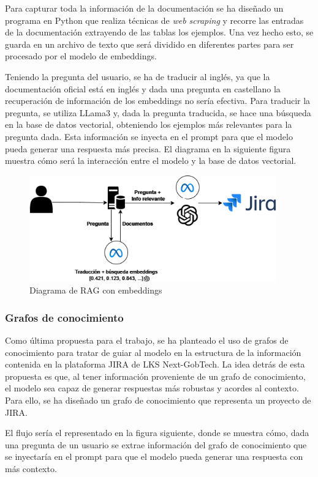 Para capturar toda la información de la documentación se ha diseñado un programa en Python que realiza técnicas de \textit{web scraping} y recorre las entradas de la documentación extrayendo de las tablas los ejemplos. Una vez hecho esto, se guarda en un archivo de texto que será dividido en diferentes partes para ser procesado por el modelo de embeddings.

Teniendo la pregunta del usuario, se ha de traducir al inglés, ya que la documentación oficial está en inglés y dada una pregunta en castellano la recuperación de información de los embeddings no sería efectiva. Para traducir la pregunta, se utiliza LLama3 y, dada la pregunta traducida, se hace una búsqueda en la base de datos vectorial, obteniendo los ejemplos más relevantes para la pregunta dada. Esta información se inyecta en el prompt para que el modelo pueda generar una respuesta más precisa. El diagrama en la siguiente figura muestra cómo será la interacción entre el modelo y la base de datos vectorial.

\begin{figure}[H]
    \centering
    \includegraphics[width=0.95\textwidth]{images/rag_embeddings.png}
    \caption{Diagrama de RAG con embeddings}\label{fig:embeddings}
\end{figure}

\subsubsection{Grafos de conocimiento}
Como última propuesta para el trabajo, se ha planteado el uso de grafos de conocimiento para tratar de guiar al modelo en la estructura de la información contenida en la plataforma JIRA de LKS Next-GobTech. La idea detrás de esta propuesta es que, al tener información proveniente de un grafo de conocimiento, el modelo sea capaz de generar respuestas más robustas y acordes al contexto. Para ello, se ha diseñado un grafo de conocimiento que representa un proyecto de JIRA.

El flujo sería el representado en la figura siguiente, donde se muestra cómo, dada una pregunta de un usuario se extrae información del grafo de conocimiento que se inyectaría en el prompt para que el modelo pueda generar una respuesta con más contexto.

